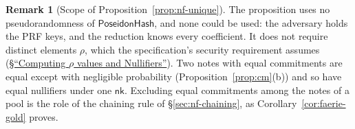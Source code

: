 \documentclass[11pt,a4paper]{article}
\theoremstyle{definition}
\newtheorem{remark}[theorem]{Remark}
\newcommand{\nksym}{\ensuremath{\mathsf{nk}}}
\begin{document}
\begin{remark}[Scope of Proposition~\ref{prop:nf-unique}]
The proposition uses no pseudorandomness of $\mathsf{PoseidonHash}$, and
none could be used: the adversary holds the PRF keys, and the reduction
knows every coefficient. It does not require distinct elements $\rho$, which
the specification's security requirement assumes
(\href{https://zips.z.cash/protocol/protocol.pdf#rhoandnullifiers}%
{\S``Computing $\rho$ values and Nullifiers''}). Two notes with equal
commitments are equal except
with negligible probability (Proposition~\ref{prop:cm}(b)) and so have equal
nullifiers under one $\nksym$. Excluding equal commitments among the notes of
a pool is the role of the chaining rule of \S\ref{sec:nf-chaining}, as
Corollary~\ref{cor:faerie-gold} proves.
\end{remark}
\end{document}
